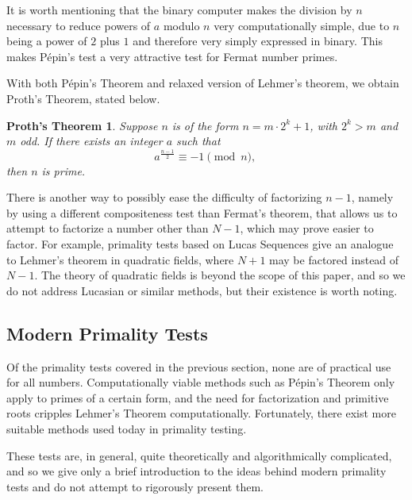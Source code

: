 \documentclass{article}
\begin{document}
It is worth mentioning that the binary computer makes the division by $n$ necessary to reduce powers of $a$ modulo $n$ very computationally simple, due to $n$ being a power of $2$ plus $1$ and therefore very simply expressed in binary. This makes P\'{e}pin's test a very attractive test for Fermat number primes. 

With both  P\'{e}pin's Theorem and relaxed version of Lehmer's theorem, we obtain Proth's Theorem, stated below.

\newtheorem*{proth}{Proth's Theorem}
\begin{proth}
Suppose $n$ is of the form $n = m \cdot 2^k + 1$, with $2^k > m$ and $m$ odd. If there exists an integer $a$ such that 
	$$a^{\frac{n-1}{2}} \equiv -1 \pmod n \text{, }$$
then $n$ is prime.
\end{proth}

\par There is another way to possibly ease the difficulty of factorizing $n - 1$, namely by using a different compositeness test than Fermat's theorem, that allows us to attempt to factorize a number other than $N - 1$, which may prove easier to factor. For example, primality tests based on Lucas Sequences give an analogue to Lehmer's theorem in quadratic fields, where $N+1$ may be factored instead of $N-1$. The theory of quadratic fields is beyond the scope of this paper, and so we do not address Lucasian or similar methods, but their existence is worth noting.



\subsection*{Modern Primality Tests}

\par Of the primality tests covered in the previous section, none are of practical use for all numbers. Computationally viable methods such as P\'{e}pin's Theorem only apply to primes of a certain form, and the need for factorization and primitive roots cripples Lehmer's Theorem computationally. Fortunately, there exist more suitable methods used today in primality testing. 
\par These tests are, in general, quite theoretically and algorithmically complicated, and so we give only a brief introduction to the ideas behind modern primality tests and do not attempt to rigorously present them.
\end{document}
